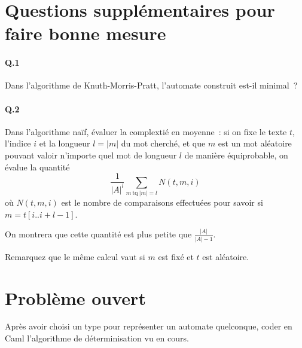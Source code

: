 \documentclass[10pt,a4paper]{article}
\begin{document}
\section{Questions supplémentaires pour faire bonne mesure}
\paragraph{Q.1} Dans l'algorithme de Knuth-Morris-Pratt, l'automate construit 
est-il minimal~?
\paragraph{Q.2} Dans l'algorithme naïf, évaluer la complextié en moyenne~: si on 
fixe le texte $t$, l'indice $i$ et la longueur $l=|m|$ du mot cherché, et que $m$ 
est un mot aléatoire pouvant valoir n'importe quel mot de longueur $l$ de manière 
équiprobable, on évalue la quantité
\[\frac1{|A|^l} \sum_{ m \ \mathrm{tq} \ |m| = l} N(t,m,i) \]
où $N(t,m,i)$ est le nombre de comparaisons effectuées pour savoir si 
$m=t[i..i+l-1]$.

On montrera que cette quantité est plus petite que $\frac{|A|}{|A|-1}$.

Remarquez que le même calcul vaut si $m$ est fixé et $t$ est aléatoire.

\section{Problème ouvert}
Après avoir choisi un type pour représenter un automate quelconque, coder en Caml
l'algorithme de déterminisation vu en cours.
\end{document}
